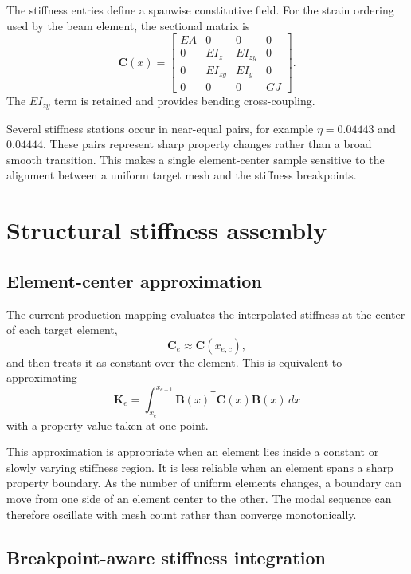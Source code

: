 \documentclass[11pt,a4paper]{article}
\newcommand{\mat}[1]{\bm{#1}}
\begin{document}
The stiffness entries define a spanwise constitutive field.  For the strain
ordering used by the beam element, the sectional matrix is
\begin{equation}
\mat{C}(x)=
\begin{bmatrix}
EA & 0 & 0 & 0\\
0 & EI_z & EI_{zy} & 0\\
0 & EI_{zy} & EI_y & 0\\
0 & 0 & 0 & GJ
\end{bmatrix}.
\end{equation}
The \(EI_{zy}\) term is retained and provides bending cross-coupling.

Several stiffness stations occur in near-equal pairs, for example
\(\eta=0.04443\) and \(0.04444\).  These pairs represent sharp property
changes rather than a broad smooth transition.  This makes a single
element-center sample sensitive to the alignment between a uniform target
mesh and the stiffness breakpoints.

\section{Structural stiffness assembly}

\subsection{Element-center approximation}

The current production mapping evaluates the interpolated stiffness at the
center of each target element,
\begin{equation}
\mat{C}_e \approx \mat{C}(x_{e,c}),
\end{equation}
and then treats it as constant over the element.  This is equivalent to
approximating
\begin{equation}
\mat{K}_e = \int_{x_e}^{x_{e+1}}
\mat{B}(x)^{\mathsf T}\mat{C}(x)\mat{B}(x)\,dx
\end{equation}
with a property value taken at one point.

This approximation is appropriate when an element lies inside a constant or
slowly varying stiffness region.  It is less reliable when an element spans a
sharp property boundary.  As the number of uniform elements changes, a
boundary can move from one side of an element center to the other.  The modal
sequence can therefore oscillate with mesh count rather than converge
monotonically.

\subsection{Breakpoint-aware stiffness integration}
\end{document}
